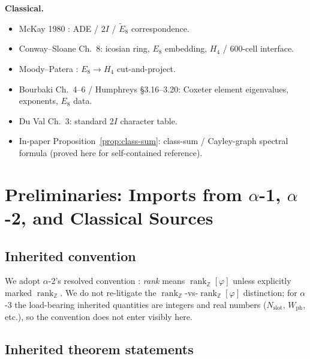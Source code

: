 \documentclass[11pt, a4paper]{amsart}
\theoremstyle{definition}
\newcommand{\Z}{\mathbb{Z}}
\newcommand{\rk}{\operatorname{rank}}
\newcommand{\Ophi}{\mathbb{Z}[\varphi]}
\newcommand{\Wph}{W_{\mathrm{ph}}}
\newcommand{\Nslot}{N_{\mathrm{slot}}}
\begin{document}
\textbf{Classical.}
\begin{itemize}
\item McKay 1980 \cite{McKay80}: ADE / $2I$ /
  $\widetilde{E}_8$ correspondence.
\item Conway--Sloane \cite{ConwaySloane} Ch.~8: icosian
  ring, $E_8$ embedding, $H_4$ / $600$-cell interface.
\item Moody--Patera \cite{MoodyPatera}: $E_8 \to H_4$
  cut-and-project.
\item Bourbaki \cite{Bourbaki46} Ch.~4--6 / Humphreys
  \cite{Humphreys} \S 3.16--3.20: Coxeter element
  eigenvalues, exponents, $E_8$ data.
\item Du Val \cite{DuVal} Ch.~3: standard $2I$ character
  table.
\item In-paper Proposition~\ref{prop:class-sum}: class-sum /
  Cayley-graph spectral formula (proved here for self-contained
  reference).
\end{itemize}

\section{Preliminaries: Imports from $\alpha$-1, $\alpha$-2,
  and Classical Sources}
\label{sec:prelims}

\subsection{Inherited convention}

We adopt $\alpha$-2's resolved convention
\cite[Notation~not:rank-conv]{CascadePhasonCoxeter}:
\emph{rank} means $\rk_\Ophi$ unless explicitly marked
$\rk_\Z$. We do not re-litigate the $\rk_\Z$-vs-$\rk_\Ophi$
distinction; for $\alpha$-3 the load-bearing inherited
quantities are integers and real numbers
($\Nslot$, $\Wph$, etc.), so the convention does not enter
visibly here.

\subsection{Inherited theorem statements}
\end{document}

